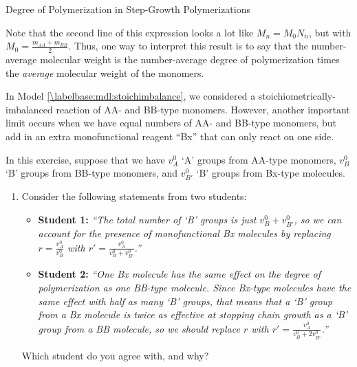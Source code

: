 \begin{activity}{Degree of Polymerization in Step-Growth Polymerizations}
\begin{exercises}
\begin{enumerate}
\begin{solution}
{						Note that the second line of this expression looks a lot like $M_n = M_0 N_n$, but with $M_0 = \frac{m_{AA} + m_{BB}}{2}$.  Thus, one way to interpret this result is to say that the number-average molecular weight is the number-average degree of polymerization times the \emph{average} molecular weight of the monomers.
					}\end{solution}
				
			\end{enumerate}
		
		\exercise In Model \ref{\labelbase:mdl:stoichimbalance}, we considered a stoichiometrically-imbalanced reaction of AA- and BB-type monomers.  However, another important limit occurs when we have equal numbers of AA- and BB-type monomers, but add in an extra monofunctional reagent ``Bx'' that can only react on one side.
		
			In this exercise, suppose that we have $v_A^0$ `A' groups from AA-type monomers, $v_B^0$ `B' groups from BB-type monomers, and $v_{B'}^0$ `B' groups from Bx-type molecules.
		
			\begin{enumerate}
				\item Consider the following statements from two students:
					
					\begin{itemize}
				
					\item \textbf{Student 1:} \emph{``The total number of `B' groups is just $v_B^0 + v_{B'}^0$, so we can account for the presence of monofunctional Bx molecules by replacing $r=\frac{v_A^0}{v_B^0}$ with $r'=\frac{v_A^0}{v_B^0 + v_{B'}^0}$.''}
					
					\item \textbf{Student 2:} \emph{``One Bx molecule has the same effect on the degree of polymerization as one BB-type molecule.  Since Bx-type molecules have the same effect with half as many `B' groups, that means that a `B' group from a Bx molecule is twice as effective at stopping chain growth as a `B' group from a BB molecule, so we should replace $r$ with $r'=\frac{v_A^0}{v_B^0 + 2v_{B'}^0}$.''}
					\end{itemize}
					
					Which student do you agree with, and why?
				
					\begin{solution}
\end{solution}
\end{enumerate}
\end{exercises}
\end{activity}
